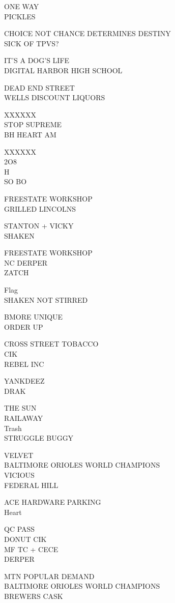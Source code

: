 \documentclass[10pt,letterpaper]{article}
\begin{document}
ONE WAY\\
PICKLES

CHOICE NOT CHANCE DETERMINES DESTINY\\
SICK OF TPVS?

IT'S A DOG'S LIFE\\
DIGITAL HARBOR HIGH SCHOOL

DEAD END STREET\\
WELLS DISCOUNT LIQUORS

XXXXXX\\
STOP SUPREME\\
BH HEART AM

XXXXXX\\
2O8\\
H\\
SO BO

FREESTATE WORKSHOP\\
GRILLED LINCOLNS

STANTON + VICKY\\
SHAKEN

FREESTATE WORKSHOP\\
NC DERPER\\
ZATCH

Flag\\
SHAKEN NOT STIRRED

BMORE UNIQUE\\
ORDER UP

CROSS STREET TOBACCO\\
CIK\\
REBEL INC

YANKDEEZ\\
DRAK

THE SUN\\
RAILAWAY\\
Trash\\
STRUGGLE BUGGY

VELVET\\
BALTIMORE ORIOLES WORLD CHAMPIONS\\
VICIOUS\\
FEDERAL HILL

ACE HARDWARE PARKING\\
Heart

QC PASS\\
DONUT CIK\\
MF TC + CECE\\
DERPER

MTN POPULAR DEMAND\\
BALTIMORE ORIOLES WORLD CHAMPIONS\\
BREWERS CASK
\end{document}
